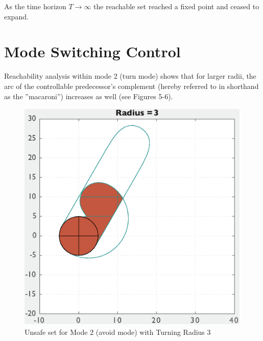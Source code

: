 \documentclass[a4paper]{article}
\begin{document}
As the time horizon $T \rightarrow \infty$ the reachable set reached a fixed point and ceased to expand.

\section{Mode Switching Control}
Reachability analysis within mode 2 (turn mode) shows that for larger radii, the arc of the controllable predecessor's complement (hereby referred to in shorthand as the ''macaroni'') increases as well (see Figures 5-6).
\begin{figure}[!ht]
  \centering
  \begin{minipage}[b]{0.4\textwidth}
    \includegraphics[width=1.0\textwidth]{HyAvoid3over.eps}
    \caption{Unsafe set for Mode 2 (avoid mode) with Turning Radius 3}
  \end{minipage}
  \hfill
  \begin{minipage}[b]{0.4\textwidth}

\end{minipage}
\end{figure}
\end{document}
